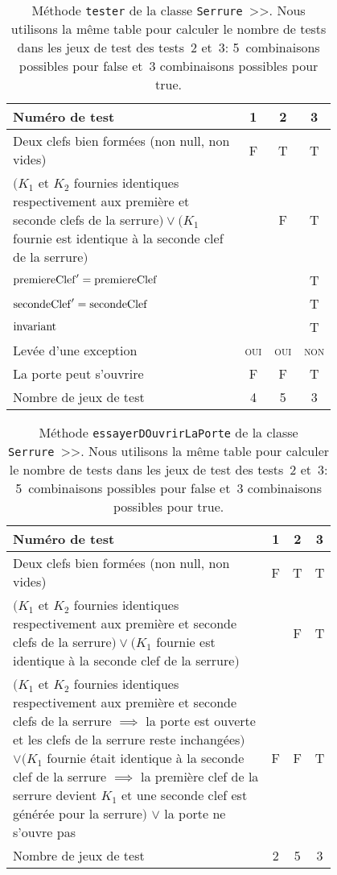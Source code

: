 \documentclass[11pt,article]{article}
\newcommand{\nullvalue}{\textsf{null}\xspace}
\newcommand{\invariant}{\ensuremath\mathrm{invariant}}
\begin{document}
\begin{table}[htbp!]
\begin{center}
\begin{tabular}{|p{0.8\linewidth}|c|c|c|}
\hline
Numéro de test
&1&2&3\\
\hline
\hline
Deux clefs bien formées (non \nullvalue, non vides)
&F&T&T\\
\hline
{\small$(K_1$ et $K_2$ fournies identiques respectivement aux
première et seconde clefs de la serrure$) \lor (K_1$ fournie est
identique à la seconde clef de la serrure$)$}
& &F&T\\
\hline
\hline
$\mathrm{premiereClef}' = \mathrm{premiereClef}$
& & &T\\
\hline
$\mathrm{secondeClef}' = \mathrm{secondeClef}$
& & &T\\
\hline
$\invariant$
& & &T\\
\hline
Levée d'une exception&\textsc{oui}&\textsc{oui}&\textsc{non}\\
\hline
\hline
La porte peut s'ouvrire
&F&F&T\\
\hline
\hline
Nombre de jeux de test 
&4&5&3\\
\hline
\end{tabular}
\caption{Méthode \texttt{tester} de la classe
  \texttt{Serrure}~>>. Nous utilisons la même table pour calculer le
  nombre de tests dans les jeux de test des tests~2 et~3:
  5~combinaisons possibles pour \textsf{false} et~3 combinaisons
  possibles pour \textsf{true}.}
\end{center}
\end{table}

\begin{table}[htbp!]
\begin{center}
\begin{tabular}{|p{0.8\linewidth}|c|c|c|}
\hline
Numéro de test
&1&2&3\\
\hline
\hline
Deux clefs bien formées (non \nullvalue, non vides)
&F&T&T\\
\hline
{\small$(K_1$ et $K_2$ fournies identiques respectivement aux
première et seconde clefs de la serrure$) \lor (K_1$ fournie est
identique à la seconde clef de la serrure$)$}
& &F&T\\
\hline
{\small
$\bigl(K_1$ et $K_2$ fournies identiques respectivement aux
première et seconde clefs de la serrure $\implies$ la porte est
ouverte et les clefs de la serrure reste inchangées$\bigr)$
\newline
$\lor\bigl(K_1$ fournie était identique à la
seconde clef de la serrure $\implies$ la première clef de la serrure
devient $K_1$ et une seconde clef est générée pour la serrure$\bigr)$
\newline
$\lor$ la porte ne s'ouvre pas}
&F&F&T\\
\hline
\hline
Nombre de jeux de test
&2&5&3\\
\hline
\end{tabular}
\caption{Méthode \texttt{essayerDOuvrirLaPorte} de la classe
  \texttt{Serrure}~>>. Nous utilisons la même table pour calculer le
  nombre de tests dans les jeux de test des tests~2 et~3:
  5~combinaisons possibles pour \textsf{false} et~3 combinaisons
  possibles pour \textsf{true}.}
\end{center}
\end{table}
\end{document}
